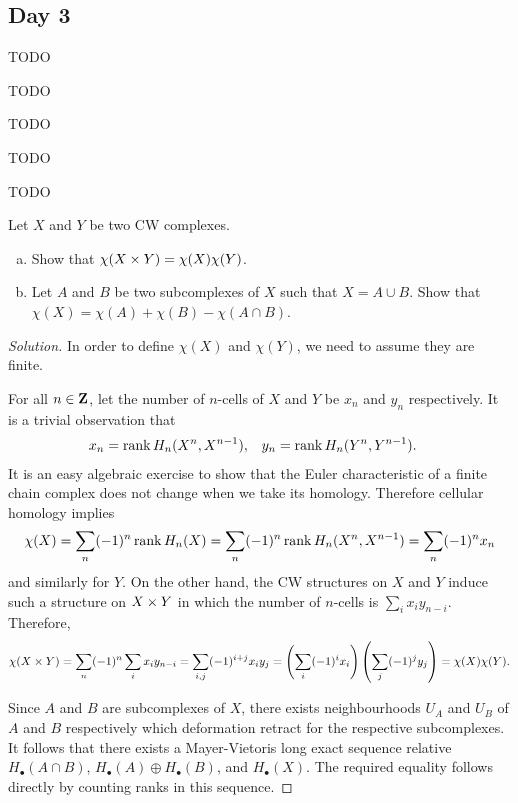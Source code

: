\subsection{Day 3}
\label{S:spring-2009-3}
\mbox{}


TODO


TODO


TODO


TODO


TODO


Let $X$ and $Y$ be two CW complexes.
\begin{enumerate}[(a)]
\item Show that $\chi(X \times Y) = \chi(X) \chi(Y)$.
\item Let $A$ and $B$ be two subcomplexes of $X$ such that $X = A \cup B$. Show that $\chi(X) = \chi(A) + \chi(B) - \chi(A \cap B)$.
\end{enumerate}

\begin{proof}[Solution]
  In order to define $\chi(X)$ and $\chi(Y)$, we need to assume they are finite.
  
  For all $n \in \mathbf{Z}$, let the number of $n$-cells of $X$ and $Y$ be $x_n$ and $y_n$ respectively. It is a trivial observation that
  \begin{align*}
    x_n &= \operatorname{rank} H_n(X^n,X^{n-1}), &
    y_n &= \operatorname{rank} H_n(Y^n,Y^{n-1}).
  \end{align*}
  It is an easy algebraic exercise to show that the Euler characteristic of a finite chain complex does not change when we take its homology. Therefore cellular homology implies
  \[
  \chi(X) =
  \sum_n (-1)^n \operatorname{rank} H_n(X) =
  \sum_n (-1)^n \operatorname{rank} H_n(X^n,X^{n-1}) =
  \sum_n (-1)^n x_n
  \]
  and similarly for $Y$. On the other hand, the CW structures on $X$ and $Y$ induce such a structure on $X \times Y$ in which the number of $n$-cells is $\sum_i x_i y_{n-i}$. Therefore,
  \[
  \chi(X \times Y) =
  \sum_n (-1)^n \sum_i x_i y_{n-i} =
  \sum_{i,j} (-1)^{i+j} x_i y_j =
  \left( \sum_i (-1)^i x_i \right) \left( \sum_j (-1)^j y_j \right) =
  \chi(X) \chi(Y).
  \]
  
  Since $A$ and $B$ are subcomplexes of $X$, there exists neighbourhoods $U_A$ and $U_B$ of $A$ and $B$ respectively which deformation retract for the respective subcomplexes. It follows that there exists a Mayer-Vietoris long exact sequence relative $H_\bullet(A \cap B)$, $H_\bullet(A) \oplus H_\bullet(B)$, and $H_\bullet(X)$. The required equality follows directly by counting ranks in this sequence.
\end{proof}

